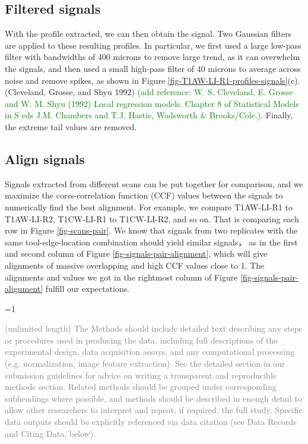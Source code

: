 \documentclass[fleqn,10pt]{wlscirep}
\newcommand{\hh}[1]{{\textcolor{Green}{#1}}}
\newcommand{\ifinstruction}{1} %
\begin{document}
\subsection{Filtered signals}\label{sec-filtered-signals}

With the profile extracted, we can then obtain the signal. Two Gaussian
filters are applied to these resulting profiles. In particular, we first
used a large low-pass filter with bandwidths of 400 microns to remove
large trend, as it can overwhelm the signals, and then used a small
high-pass filter of 40 microns to average across noise and remove
spikes, as shown in Figure \ref{fig-T1AW-LI-R1-profiles-signals}(c).
(Cleveland, Grosse, and Shyu 1992)
\hh{(add reference: W. S. Cleveland, E. Grosse and W. M. Shyu (1992) Local regression models. Chapter 8 of Statistical Models in S eds J.M. Chambers and T.J. Hastie, Wadsworth \& Brooks/Cole.)}.
Finally, the extreme tail values are removed.

\subsection{Align signals}\label{sec-align-signals}

Signals extracted from different scans can be put together for
comparison, and we maximize the corss-correlation function (CCF) values
between the signals to numerically find the best alignment. For example,
we compare T1AW-LI-R1 to T1AW-LI-R2, T1CW-LI-R1 to T1CW-LI-R2, and so
on. That is comparing each row in Figure \ref{fig-scans-pair}. We know
that signals from two replicates with the same tool-edge-location
combination should yield similar signals， as in the first and second
column of Figure \ref{fig-signals-pair-alignment}, which will give
alignments of massive overlapping and high CCF values close to 1. The
alignments and values we got in the rightmost column of Figure
\ref{fig-signals-pair-alignment} fulfill our expectations.

\ifnum \ifinstruction=1

\textcolor{gray}{(unlimited length) The Methods should include detailed text describing any steps or procedures used in producing the data, including full descriptions of the experimental design, data acquisition assays, and any computational processing (e.g. normalization, image feature extraction). See the detailed section in our submission guidelines for advice on writing a transparent and reproducible methods section. Related methods should be grouped under corresponding subheadings where possible, and methods should be described in enough detail to allow other researchers to interpret and repeat, if required, the full study. Specific data outputs should be explicitly referenced via data citation (see Data Records and Citing Data, below).}
\end{document}
